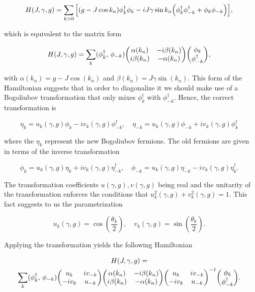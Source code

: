 \begin{equation}\label{eq:FourierHam}
    H(J,\gamma,g)  = \sum_{k>0}\qty[\qty(g - J\cos k_n)\phi_k^\dagger\phi_k - iJ\gamma\sin{k_n}\qty(\phi_k^\dagger\phi_{-k}^\dagger + \phi_k\phi_{-k})],
\end{equation}

which is equivalent to the matrix form

\begin{equation}
H(J,\gamma,g) = \sum_k (\phi_k^\dagger,\,\phi_{-k}) \mqty(\alpha(k_n)& -i\beta(k_n) \\ i\beta(k_n) & -\alpha(k_n))\mqty(\phi_k\\\phi_{-k}^\dagger),
\end{equation}

with $\alpha(k_n) = g-J\cos(k_n)$ and $\beta(k_n) = J\gamma\sin(k_n)$. This form of the Hamiltonian suggests that in order to diagonalize it we should make use of a Bogoliubov transformation that only mixes $\phi_k^{\dagger}$ with  $\phi_{-k}^{\dagger}$. Hence, the correct transformation is

\begin{equation}
\eta_k = u_k(\gamma,g)\phi_k - i v_k(\gamma,g)\phi_{-k}^\dagger,\quad\eta _{-k}=u_k(\gamma,g)\phi_{-k} + i v_k(\gamma,g)\phi_{k}^\dagger
\end{equation}

where the $\eta_k$ represent the new Bogoliubov fermions. The old fermions are given in terms of the inverse transformation

\begin{equation}
\phi_k =  u_k(\gamma,g)\eta_k + i v_k(\gamma,g)\eta_{-k}^\dagger,\quad \phi _{-k}=u_k(\gamma,g)\eta_{-k} - i v_k(\gamma,g)\eta_{k}^\dagger.
\end{equation}

The transformation coefficients $u(\gamma,g),v(\gamma,g)$ being real and the unitarity of the transformation enforces the conditions that $u_k^2(\gamma,g) + v_k  ^{2}(\gamma,g)=1$.  This fact suggests to us the parametrization

\begin{equation}
u_k(\gamma,g)  = \cos(\frac{\theta_k}{2} ),\quad v_k(\gamma,g) = \sin(\frac{\theta_k}{2}).\label{eq:paramBogo}
\end{equation}

Applying the transformation yields the following Hamiltonian

\begin{multline}
H(J,\gamma,g) =\\
 \sum_k (\phi_k^\dagger,\,\phi_{-k}) \mqty(u_k & iv_{-k}\\-iv_k & u_{-k} )\mqty(\alpha(k_n)& -i\beta(k_n) \\ i\beta(k_n) & -\alpha(k_n))\mqty(u_k & iv_{-k}\\-iv_k & u_{-k} )^{-1}\mqty(\phi_k\\\phi_{-k}^\dagger).
\end{multline}

